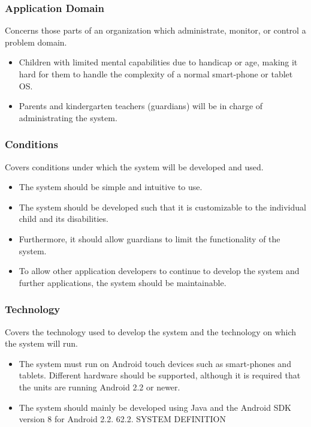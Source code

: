 \subsubsection{Application Domain} 
Concerns those parts of an organization which administrate, monitor, or control a
problem domain.
\begin{itemize}
	\item Children with limited mental capabilities due to handicap or age, making it hard for them to handle the complexity of a normal smart-phone or tablet OS. 
	\item Parents and kindergarten teachers (guardians) will be in charge of administrating the system.
\end{itemize}

\subsubsection{Conditions} 
Covers conditions under which the system will be developed and used.
\begin{itemize}
	\item The system should be simple and intuitive to use. 
	\item The system should be developed such that it is customizable to the individual child and its disabilities.
	\item Furthermore, it should allow guardians to limit the functionality of the system. 
	\item To allow other application developers to continue to develop the system and further applications, the system should be maintainable.
\end{itemize}

\subsubsection{Technology} 
Covers the technology used to develop the system and the technology on which the system will
run.
\begin{itemize}
	\item The system must run on Android touch devices such as smart-phones and tablets. Different hardware should be supported, although it is required that the units are running Android 2.2 or newer. 
	\item The system should mainly be developed using Java and the Android SDK version 8 for Android 2.2. 62.2. SYSTEM DEFINITION
\end{itemize}

